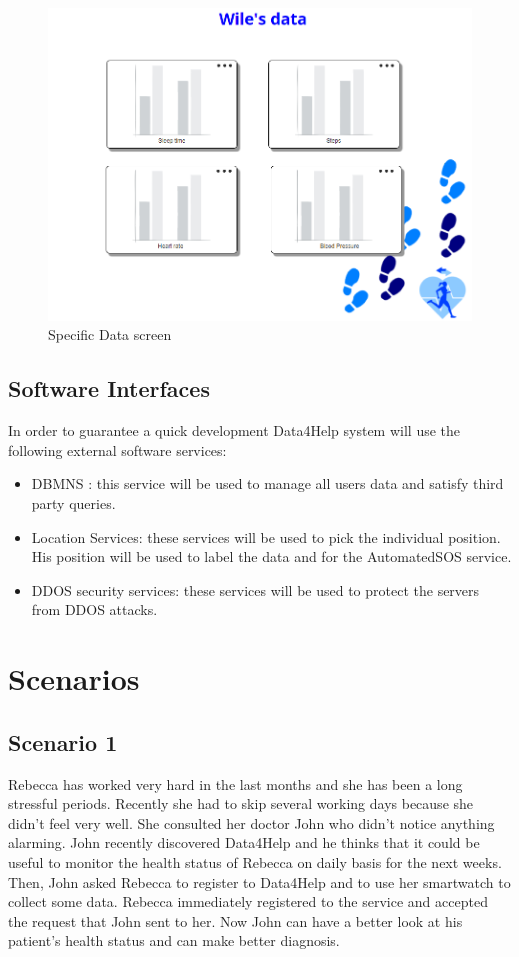 \begin{figure}[H]
\centering
  \includegraphics[width=0.79\linewidth]{resources/Screen/individualdatavisualization.png}
  \caption{Specific Data screen}
  \label{fig:WebApp Specific data screen}
\end{figure}


\subsection{Software Interfaces}
In order to guarantee a quick development Data4Help system will use the following external software services:
\begin{itemize}
\item DBMNS : this service will be used to manage all users data and satisfy third party queries.
\item Location Services: these services will be used to pick the individual position. His position will be used to label the data and for the AutomatedSOS service.
\item DDOS security services: these services will be used to protect the servers from DDOS attacks.
\end{itemize}




\section{Scenarios}
\subsection{Scenario 1}

Rebecca has worked very hard in the last months and she has been a long stressful periods. Recently she had to skip several working days because she didn't feel very well. 
She consulted her doctor John who didn't notice anything alarming.
John recently discovered Data4Help and he thinks that it could be useful to monitor the health status of Rebecca on daily basis for the next weeks.
Then, John asked Rebecca to register to Data4Help and to use her smartwatch to collect some data.
Rebecca immediately registered to the service and accepted the request that John sent to her.
Now John can have a better look at his patient's health status and can make better diagnosis.


